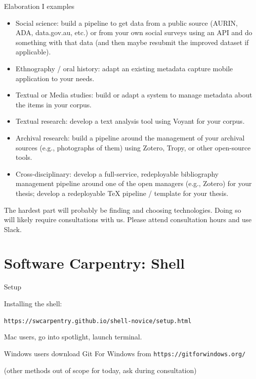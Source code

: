 \documentclass[aspectratio=1610, 11pt]{beamer} %
\begin{document}
\begin{frame}{Elaboration I examples}

\begin{itemize}[label=\textbullet]
    \item Social science: build a pipeline to get data from a public source (AURIN, ADA, data.gov.au, etc.) or from your own social surveys using an API and do something with that data (and then maybe resubmit the improved dataset if applicable).
    \item Ethnography / oral history: adapt an existing metadata capture mobile application to your needs.
    \item Textual or Media studies: build or adapt a system to manage metadata about the items in your corpus.
    \item Textual research: develop a text analysis tool using Voyant for your corpus.
    \item Archival research: build a pipeline around the management of your archival sources (e.g., photographs of them) using Zotero, Tropy, or other open-source tools.
    \item Cross-disciplinary: develop a full-service, redeployable bibliography management pipeline around one of the open managers (e.g., Zotero) for your thesis; develop a redeployable TeX pipeline / template for your thesis. 
\end{itemize}

The hardest part will probably be finding and choosing technologies. Doing so will likely require consultations with us. Please attend consultation hours and use Slack.

\end{frame}

\section{Software Carpentry: Shell}

\begin{frame}{Setup}

Installing the shell:

{\tt https://swcarpentry.github.io/shell-novice/setup.html}

Mac users, go into spotlight, launch terminal.

Windows users download Git For Windows from {\tt https://gitforwindows.org/}

(other methods out of scope for today, ask during consultation)
\end{frame}
\end{document}

